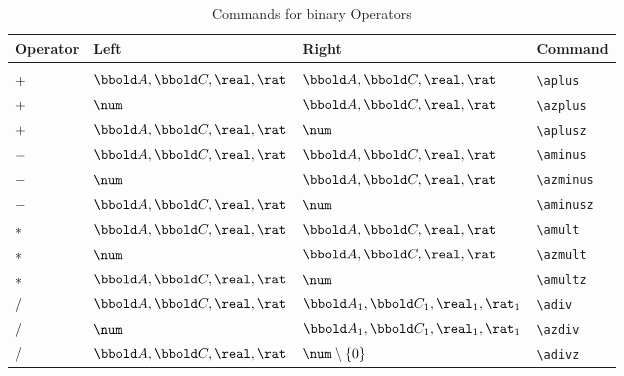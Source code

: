 \documentclass[12pt]{article}
\begin{document}
%
\begin{table}[htbp]
  \centering
  \begin{tabular}{llll}
    Operator & Left & Right & Command \\
    \hline \\
    $+$ & $\arithmos, \complex, \real, \rat$ & $\arithmos,
                                                    \complex, \real, \rat$ & \verb|\aplus| \\
    $+$ & $\num$ & $\arithmos, \complex, \real, \rat$ & \verb|\azplus| \\
    $+$ & $\arithmos, \complex, \real, \rat$ & $\num$ & \verb|\aplusz| \\
    $-$ & $\arithmos, \complex, \real, \rat$ & $\arithmos, \complex, \real, \rat$ & \verb|\aminus| \\
    $-$ & $\num$ & $\arithmos, \complex, \real, \rat$ & \verb|\azminus| \\
    $-$ & $\arithmos, \complex, \real, \rat$ & $\num$ & \verb|\aminusz| \\
    $*$ & $\arithmos, \complex, \real, \rat$ & $\arithmos, \complex, \real, \rat$ & \verb|\amult| \\
    $*$ & $\num$ & $\arithmos, \complex, \real, \rat$ & \verb|\azmult| \\
    $*$ & $\arithmos, \complex, \real, \rat$ & $\num$ & \verb|\amultz| \\
    $/$ & $\arithmos, \complex, \real, \rat$ & $\arithmos_1, \complex_1, \real_1, \rat_1$ & \verb|\adiv| \\
    $/$ & $\num$ & $\arithmos_1, \complex_1, \real_1, \rat_1$ & \verb|\azdiv| \\
    $/$ & $\arithmos, \complex, \real, \rat$ & $\num \setminus \{0\}$ & \verb|\adivz| \\
    \hline
  \end{tabular}
  \caption{Commands for binary Operators}
  \label{tab:latex-binary-operators}
\end{table}
%
\end{document}

